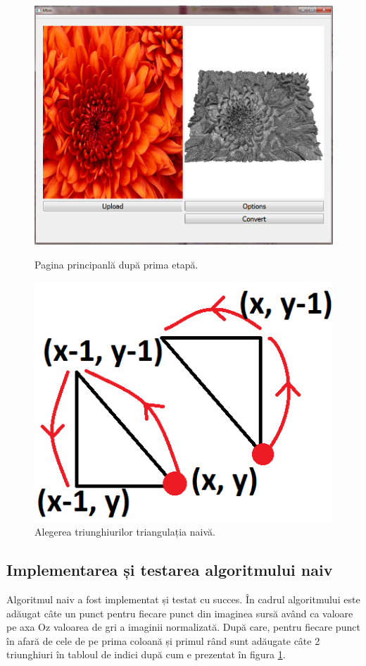 \documentclass[12pt]{article}
\begin{document}
\begin{figure}[!htb]
	\begin{minipage}{0.48\textwidth}
		\centering
		\includegraphics[width=.7\linewidth]{PrimaPaginaInterfata1.png}
		\caption{Pagina principanlă după prima etapă.}\label{fig:fig4}
	\end{minipage}\hfill
	\begin{minipage}{0.32\textwidth}
		\centering
		\includegraphics[width=.7\linewidth]{NaivaOrdine.png}
		\caption{Alegerea triunghiurilor triangulația naivă.}\label{fig:fig5}
	\end{minipage}\hfill
\end{figure}

\subsection{Implementarea și testarea algoritmului naiv}

Algoritmul naiv a fost implementat și testat cu succes. În cadrul algoritmului este adăugat câte un punct pentru fiecare punct din imaginea sursă având ca valoare pe axa Oz valoarea de gri a imaginii normalizată. După care, pentru fiecare punct în afară de cele de pe prima coloană și primul rând sunt adăugate câte 2 triunghiuri în tabloul de indici după cum e prezentat în figura \ref{fig:fig5}.
\end{document}
